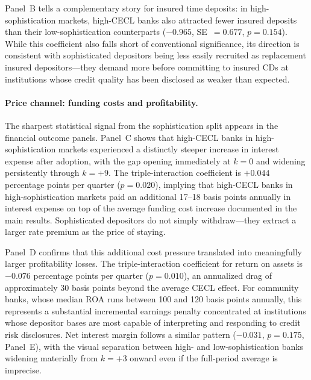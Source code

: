 Panel~B tells a complementary story for insured time deposits: in
high-sophistication markets, high-CECL banks also attracted fewer insured
deposits than their low-sophistication counterparts
($-0.965$, SE~$=0.677$, $p=0.154$). While this coefficient also falls short of
conventional significance, its direction is consistent with sophisticated
depositors being less easily recruited as replacement insured depositors---they
demand more before committing to insured CDs at institutions whose credit quality
has been disclosed as weaker than expected.

\paragraph{Price channel: funding costs and profitability.}
The sharpest statistical signal from the sophistication split appears in the
financial outcome panels. Panel~C shows that high-CECL banks in
high-sophistication markets experienced a distinctly steeper increase in interest
expense after adoption, with the gap opening immediately at $k=0$ and widening
persistently through $k=+9$. The triple-interaction coefficient is $+0.044$
percentage points per quarter ($p=0.020$), implying that high-CECL banks in
high-sophistication markets paid an additional 17--18 basis points annually in
interest expense on top of the average funding cost increase documented in the
main results. Sophisticated depositors do not simply withdraw---they extract a
larger rate premium as the price of staying.

Panel~D confirms that this additional cost pressure translated into meaningfully
larger profitability losses. The triple-interaction coefficient for return on
assets is $-0.076$ percentage points per quarter ($p=0.010$), an annualized drag
of approximately 30 basis points beyond the average CECL effect. For community
banks, whose median ROA runs between 100 and 120 basis points annually, this
represents a substantial incremental earnings penalty concentrated at institutions
whose depositor bases are most capable of interpreting and responding to credit
risk disclosures. Net interest margin follows a similar pattern
($-0.031$, $p=0.175$, Panel~E), with the visual separation between high- and
low-sophistication banks widening materially from $k=+3$ onward even if the
full-period average is imprecise.

